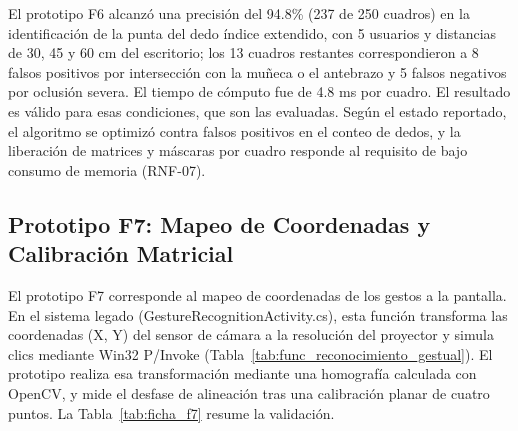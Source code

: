 El prototipo F6 alcanzó una precisión del 94.8\% (237 de 250 cuadros) en la identificación de la punta del dedo índice extendido, con 5 usuarios y distancias de 30, 45 y 60 cm del escritorio; los 13 cuadros restantes correspondieron a 8 falsos positivos por intersección con la muñeca o el antebrazo y 5 falsos negativos por oclusión severa. El tiempo de cómputo fue de 4.8 ms por cuadro. El resultado es válido para esas condiciones, que son las evaluadas. Según el estado reportado, el algoritmo se optimizó contra falsos positivos en el conteo de dedos, y la liberación de matrices y máscaras por cuadro responde al requisito de bajo consumo de memoria (RNF-07).
 
\subsection{Prototipo F7: Mapeo de Coordenadas y Calibración Matricial}
 
El prototipo F7 corresponde al mapeo de coordenadas de los gestos a la pantalla. En el sistema legado (GestureRecognitionActivity.cs), esta función transforma las coordenadas (X, Y) del sensor de cámara a la resolución del proyector y simula clics mediante Win32 P/Invoke (Tabla~\ref{tab:func_reconocimiento_gestual}). El prototipo realiza esa transformación mediante una homografía calculada con OpenCV, y mide el desfase de alineación tras una calibración planar de cuatro puntos. La Tabla~\ref{tab:ficha_f7} resume la validación.
 
